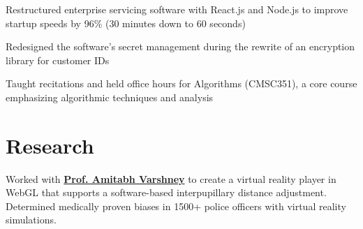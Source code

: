 \documentclass[]{deedy-resume}
\begin{document}
\begin{minipage}[t]{0.66\textwidth}
\begin{tightemize}
\item Restructured enterprise servicing software with React.js and Node.js to improve startup speeds by 96\% (30 minutes down to 60 seconds)
\item Redesigned the software's secret management during the rewrite of an encryption library for customer IDs
\end{tightemize}
\sectionsep %

\begin{tightemize}
\item Taught recitations and held office hours for Algorithms (CMSC351), a core course emphasizing algorithmic techniques and analysis
\end{tightemize}
\sectionsep %


\section{Research}
Worked with \textbf{\href{https://www.cs.umd.edu/~varshney/}{Prof. Amitabh Varshney}} to create a virtual reality player in WebGL that supports a software-based interpupillary distance adjustment. Determined medically proven biases in 1500+ police officers with virtual reality simulations.
\sectionsep %


\end{minipage}
\end{document}
